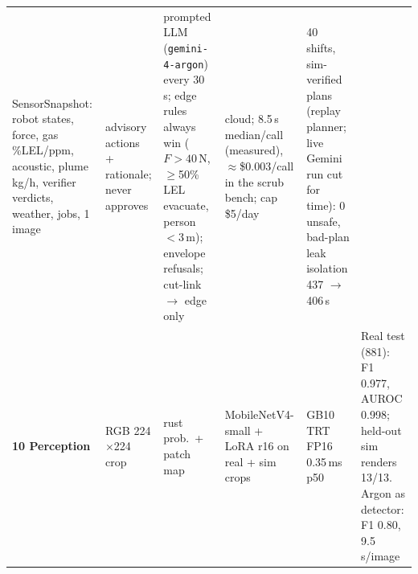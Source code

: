 \documentclass[8pt,a4paper]{extarticle}
\newcommand{\fn}[1]{{\fontsize{5.6}{6.4}\selectfont\ttfamily #1}}
\begin{document}
\begin{tabularx}{\textwidth}{@{}L{1.85cm}L{4.05cm}L{2.45cm}L{3.75cm}L{1.95cm}Y@{}}
SensorSnapshot: robot states, force, gas \%LEL/ppm, acoustic, plume kg/h, verifier verdicts, weather, jobs, 1 image &
advisory actions + rationale; never approves &
prompted LLM (\texttt{gemini-4-argon}) every 30\,s; edge rules always win ($F{>}40$\,N, $\geq$50\% LEL evacuate, person
$<$3\,m); envelope refusals; cut-link $\to$ edge only &
cloud; 8.5\,s median/call (measured), $\approx$\$0.003/call in the scrub bench; cap \$5/day &
40 shifts, sim-verified plans (replay planner; live Gemini run cut for time): 0 unsafe, bad-plan leak isolation 437 $\to$ 406\,s \\
\addlinespace[1pt]
\textbf{10 Perception} \newline \fn{detection/} &
RGB 224$\times$224 crop &
rust prob.\ + patch map &
MobileNetV4-small + LoRA r16 on real + sim crops &
GB10 TRT FP16 0.35\,ms p50 &
Real test (881): F1 0.977, AUROC 0.998; held-out sim renders 13/13. Argon as detector: F1 0.80, 9.5\,s/image \\
\bottomrule
\end{tabularx}
\end{document}
